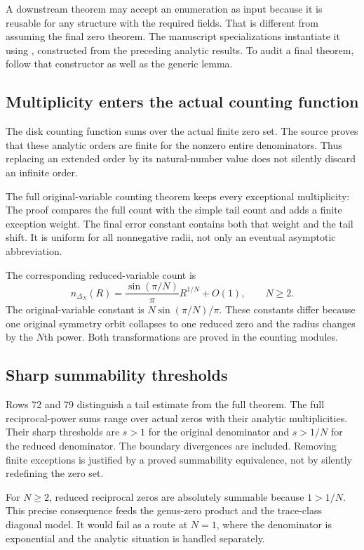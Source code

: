 A downstream theorem may accept an enumeration as input because it is reusable for any structure with the required fields. That is different from assuming the final zero theorem. The manuscript specializations instantiate it using , constructed from the preceding analytic results. To audit a final theorem, follow that constructor as well as the generic lemma.

\subsection{Multiplicity enters the actual counting function}
The disk counting function sums  over the actual finite zero set. The source proves that these analytic orders are finite for the nonzero entire denominators. Thus replacing an extended order by its natural-number value does not silently discard an infinite order.

The full original-variable counting theorem keeps every exceptional multiplicity:
The proof compares the full count with the simple tail count and adds a finite exception weight. The final error constant contains both that weight and the tail shift. It is uniform for all nonnegative radii, not only an eventual asymptotic abbreviation.

The corresponding reduced-variable count is
\[
 n_{\Delta_N}(R)=\frac{\sin(\pi/N)}{\pi}R^{1/N}+O(1),\qquad N\geq2.
\]
The original-variable constant is $N\sin(\pi/N)/\pi$. These constants differ because one original symmetry orbit collapses to one reduced zero and the radius changes by the $N$th power. Both transformations are proved in the counting modules.

\subsection{Sharp summability thresholds}
Rows 72 and 79 distinguish a tail estimate from the full theorem. The full reciprocal-power sums range over actual zeros with their analytic multiplicities. Their sharp thresholds are $s>1$ for the original denominator and $s>1/N$ for the reduced denominator. The boundary divergences are included. Removing finite exceptions is justified by a proved summability equivalence, not by silently redefining the zero set.

For $N\geq2$, reduced reciprocal zeros are absolutely summable because $1>1/N$. This precise consequence feeds the genus-zero product and the trace-class diagonal model. It would fail as a route at $N=1$, where the denominator is exponential and the analytic situation is handled separately.

